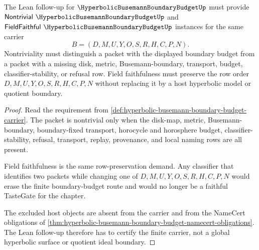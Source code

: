 \begin{theorem}
\label{thm:hyperbolic-busemann-boundary-budget-tastegate-requirements}
The Lean follow-up for $\HyperbolicBusemannBoundaryBudgetUp$ must provide $\mathsf{Nontrivial}\ \HyperbolicBusemannBoundaryBudgetUp$ and $\mathsf{FieldFaithful}\ \HyperbolicBusemannBoundaryBudgetUp$ instances for the same carrier
$$
B=(D,M,U,Y,O,S,R,H,C,P,N).
$$
Nontriviality must distinguish a packet with the displayed boundary budget from a packet with a missing disk, metric, Busemann-boundary, transport, budget, classifier-stability, or refusal row. Field faithfulness must preserve the row order $D,M,U,Y,O,S,R,H,C,P,N$ without replacing it by a host hyperbolic model or quotient boundary.
\end{theorem}
\begin{proof}
Read the requirement from \autoref{def:hyperbolic-busemann-boundary-budget-carrier}. The packet is nontrivial only when the disk-map, metric, Busemann-boundary, boundary-fixed transport, horocycle and horosphere budget, classifier-stability, refusal, transport, replay, provenance, and local naming rows are all present.

Field faithfulness is the same row-preservation demand. Any classifier that identifies two packets while changing one of $D,M,U,Y,O,S,R,H,C,P,N$ would erase the finite boundary-budget route and would no longer be a faithful TasteGate for the chapter.

The excluded host objects are absent from the carrier and from the NameCert obligations of \autoref{thm:hyperbolic-busemann-boundary-budget-namecert-obligations}. The Lean follow-up therefore has to certify the finite carrier, not a global hyperbolic surface or quotient ideal boundary.
\end{proof}



